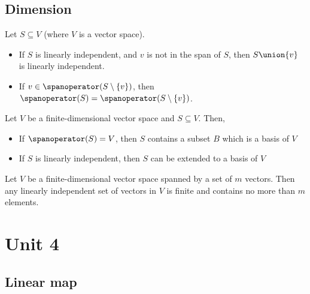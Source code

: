 \begin{definition}[$P_m(F)$]
\end{definition}

\begin{definition}
\end{definition}

\subsection{Dimension}

\begin{namedtheorem}
  Let $S \subseteq V$ (where $V$ is a vector space).
  \begin{itemize}
    \item If $S$ is linearly independent, and $v$ is not in the span of $S$, then $S \union \{v\}$ is linearly independent.
    \item If $v \in \spanoperator(S \setminus \{v\})$, then $\spanoperator(S) = \spanoperator(S \setminus \{v\})$.
  \end{itemize}
\end{namedtheorem}

\begin{theorem}
  Let $V$ be a finite-dimensional vector space and $S \subseteq V$. Then,
  \begin{itemize}
    \item If $\spanoperator(S) = V$, then $S$ contains a subset $B$ which is a basis of $V$
    \item If $S$ is linearly independent, then $S$ can be extended to a basis of $V$
  \end{itemize}
\end{theorem}

\begin{theorem}
  Let $V$ be a finite-dimensional vector space spanned by a set of $m$ vectors. Then any linearly independent set of vectors in $V$ is finite and contains no more than $m$ elements.
\end{theorem}

\section{Unit 4}

\subsection{Linear map}

